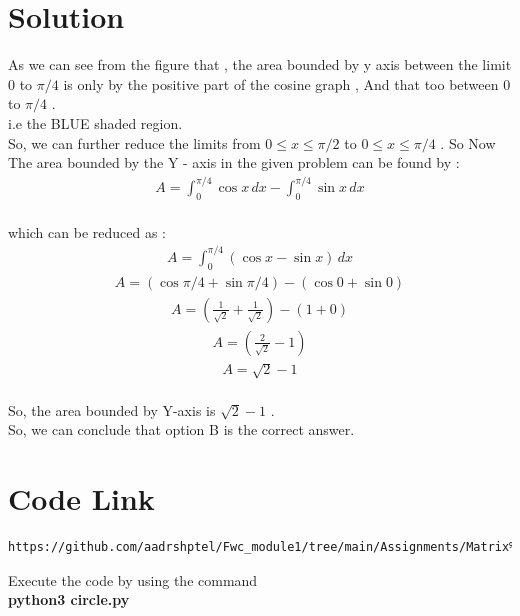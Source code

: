\documentclass[journal,12pt,twocolumn]{IEEEtran}
\begin{document}
\section{\textbf{Solution}}
As we can see from the figure that , the area bounded by y axis between the limit 0 to $\pi/4$ is only by the positive part of the cosine graph , And that too between 0 to $\pi/4$ .\\
i.e the BLUE shaded region.\\
So, we can further reduce the limits from $ 0 \le x \le \pi/2$ to 
$ 0 \le x \le \pi/4$ .
So Now
The area bounded by the Y - axis in the given problem can be found by :
\begin{align}
A = \int_{0}^{\pi/4} \cos x \,dx -  \int_{0}^{\pi/4} \sin x \,dx 
\end{align}
\\
which can be reduced as : 
\begin{align}
A =\int_{0}^{\pi/4} (\cos x - \sin x) \,dx
\end{align}
\begin{align}
A = (\cos{\pi/4} + \sin{\pi/4}) - (\cos{0} + \sin{0}) 
\end{align}
\begin{align}
A = (\frac{1}{\sqrt{2}}+ \frac{1}{\sqrt{2}}) - (1+0) 
\end{align}
\begin{align}
A = (\frac{2}{\sqrt{2}} - 1)
\end{align}
\begin{align}
A = \sqrt{2} -1
\end{align}
\\
So, the area bounded by Y-axis is $\sqrt{2}-1$ .\\
So, we can conclude that option B is the correct answer.
 


\section{\textbf{Code Link}}

\begin{lstlisting}
https://github.com/aadrshptel/Fwc_module1/tree/main/Assignments/Matrix%20assignments/Conics/codes
\end{lstlisting}
Execute the code by using the command\\
\textbf{python3 circle.py}
\end{document}
